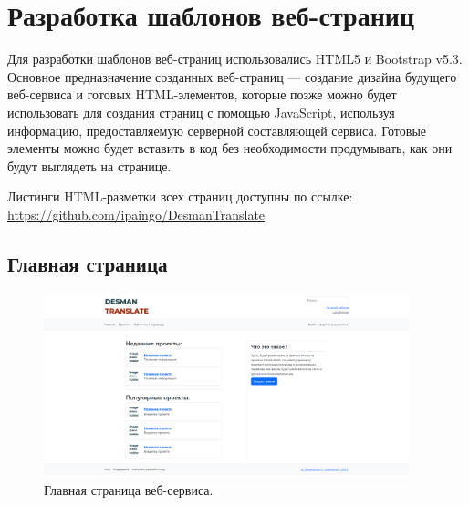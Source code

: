 \documentclass[a4paper,12pt]{article}
\begin{document}




\newpage
\section{Разработка шаблонов веб-страниц}

Для разработки шаблонов веб-страниц использовались HTML5 и Bootstrap v5.3. Основное предназначение созданных веб-страниц — создание дизайна будущего веб-сервиса и готовых HTML-элементов, которые позже можно будет использовать для создания страниц с помощью JavaScript, используя информацию, предоставляемую серверной составляющей сервиса. Готовые элементы можно будет вставить в код без необходимости продумывать, как они будут выглядеть на странице.

Листинги HTML-разметки всех страниц доступны по ссылке:\\
\href{https://github.com/ipaingo/DesmanTranslate}{https://github.com/ipaingo/DesmanTranslate}\\


\subsection{Главная страница}

\begin{figure}[h]
\centering
\includegraphics[width=400px]{index.png}
\caption{Главная страница веб-сервиса.}
\label{fig:index}
\end{figure}
\end{document}
